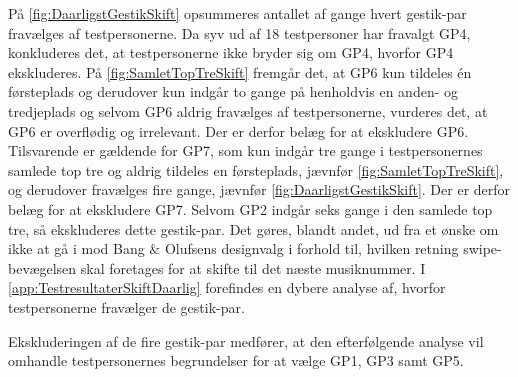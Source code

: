 På \autoref{fig:DaarligstGestikSkift} opsummeres antallet af gange hvert gestik-par fravælges af testpersonerne. Da syv ud af 18 testpersoner har fravalgt GP4, konkluderes det, at testpersonerne ikke bryder sig om GP4, hvorfor GP4 ekskluderes. På \autoref{fig:SamletTopTreSkift} fremgår det, at GP6 kun tildeles én førsteplads og derudover kun indgår to gange på henholdvis en anden- og tredjeplads og selvom GP6 aldrig fravælges af testpersonerne, vurderes det, at GP6 er overflødig og irrelevant. Der er derfor belæg for at ekskludere GP6. Tilsvarende er gældende for GP7, som kun indgår tre gange i testpersonernes samlede top tre og aldrig tildeles en førsteplads, jævnfør \autoref{fig:SamletTopTreSkift}, og derudover fravælges fire gange, jævnfør \autoref{fig:DaarligstGestikSkift}. Der er derfor belæg for at ekskludere GP7. Selvom GP2 indgår seks gange i den samlede top tre, så ekskluderes dette gestik-par. Det gøres, blandt andet, ud fra et ønske om ikke at gå i mod Bang $\&$ Olufsens designvalg i forhold til, hvilken retning swipe-bevægelsen skal foretages for at skifte til det næste musiknummer. I \autoref{app:TestresultaterSkiftDaarlig} forefindes en dybere analyse af, hvorfor testpersonerne fravælger de gestik-par. 

Ekskluderingen af de fire gestik-par medfører, at den efterfølgende analyse vil omhandle testpersonernes begrundelser for at vælge GP1, GP3 samt GP5.
%
